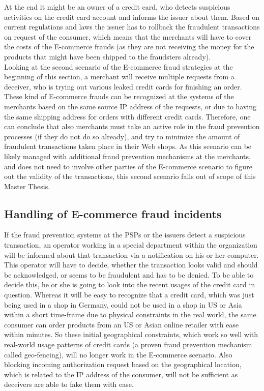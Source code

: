 At the end it might be an owner of a credit card, who detects suspicious activities on the credit card account and informs the issuer about them. Based on current regulations and laws the issuer has to rollback the fraudulent transactions on request of the consumer, which means that the merchants will have to cover the costs of the \gls{E-commerce} frauds (as they are not receiving the money for the products that might have been shipped to the fraudsters already). \\

Looking at the second scenario of the \gls{E-commerce} fraud strategies at the beginning of this section, a merchant will receive multiple requests from a deceiver, who is trying out various leaked credit cards for finishing an order. These kind of \gls{E-commerce} frauds can be recognized at the systems of the merchants based on the same source \gls{IP} address of the requests, or due to having the same shipping address for orders with different credit cards. Therefore, one can conclude that also merchants must take an active role in the fraud prevention processes (if they do not do so already), and try to minimize the amount of fraudulent transactions taken place in their Web shops. As this scenario can be likely managed with additional fraud prevention mechanisms at the merchants, and does not need to involve other parties of the \gls{E-commerce} scenario to figure out the validity of the transactions, this second scenario falls out of scope of this Master Thesis.


\subsection{Handling of \gls{E-commerce} fraud incidents}
\label{subsec:e_commerce_fraud_handling}

If the fraud prevention systems at the \gls{PSP}s or the issuers detect a suspicious transaction, an operator working in a special department within the organization will be informed about that transaction via a notification on his or her computer. This operator will have to decide, whether the transaction looks valid and should be acknowledged, or seems to be fraudulent and has to be denied. To be able to decide this, he or she is going to look into the recent usages of the credit card in question. Whereas it will be easy to recognize that a credit card, which was just being used in a shop in Germany, could not be used in a shop in US or Asia within a short time-frame due to physical constraints in the real world, the same consumer can order products from an US or Asian online retailer with ease within minutes. So these initial geographical constraints, which work so well with real-world usage patterns of credit cards (a proven fraud prevention mechanism called geo-fencing), will no longer work in the \gls{E-commerce} scenario. Also blocking incoming authorization request based on the geographical location, which is related to the \gls{IP} address of the consumer, will not be sufficient as deceivers are able to fake them with ease. \\

